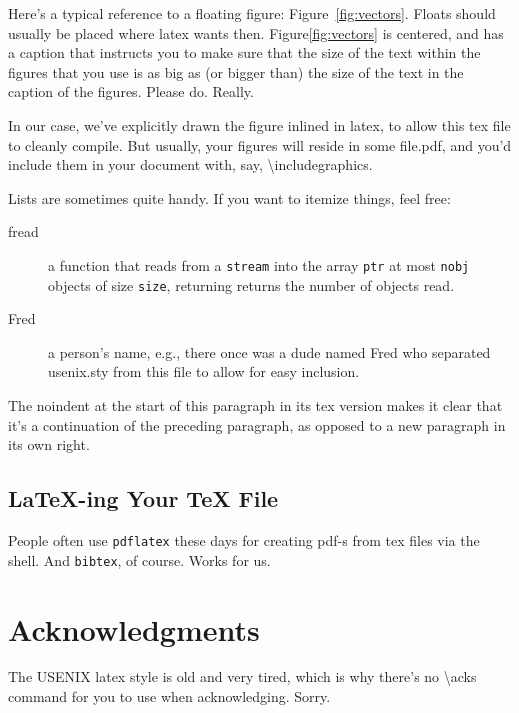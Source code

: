 \documentclass[a4paper,10pt,titlepage]{ctexart}
\begin{document}
Here's a typical reference to a floating figure:
Figure~\ref{fig:vectors}. Floats should usually be placed where latex
wants then. Figure\ref{fig:vectors} is centered, and has a caption
that instructs you to make sure that the size of the text within the
figures that you use is as big as (or bigger than) the size of the
text in the caption of the figures. Please do. Really.

In our case, we've explicitly drawn the figure inlined in latex, to
allow this tex file to cleanly compile. But usually, your figures will
reside in some file.pdf, and you'd include them in your document
with, say, \textbackslash{}includegraphics.

Lists are sometimes quite handy. If you want to itemize things, feel
free:

\begin{description}
  
\item[fread] a function that reads from a \texttt{stream} into the
  array \texttt{ptr} at most \texttt{nobj} objects of size
  \texttt{size}, returning returns the number of objects read.

\item[Fred] a person's name, e.g., there once was a dude named Fred
  who separated usenix.sty from this file to allow for easy
  inclusion.
\end{description}

\noindent
The noindent at the start of this paragraph in its tex version makes
it clear that it's a continuation of the preceding paragraph, as
opposed to a new paragraph in its own right.


\subsection{LaTeX-ing Your TeX File}

People often use \texttt{pdflatex} these days for creating pdf-s from
tex files via the shell. And \texttt{bibtex}, of course. Works for us.

\section*{Acknowledgments}

The USENIX latex style is old and very tired, which is why
there's no \textbackslash{}acks command for you to use when
acknowledging. Sorry.
\end{document}
